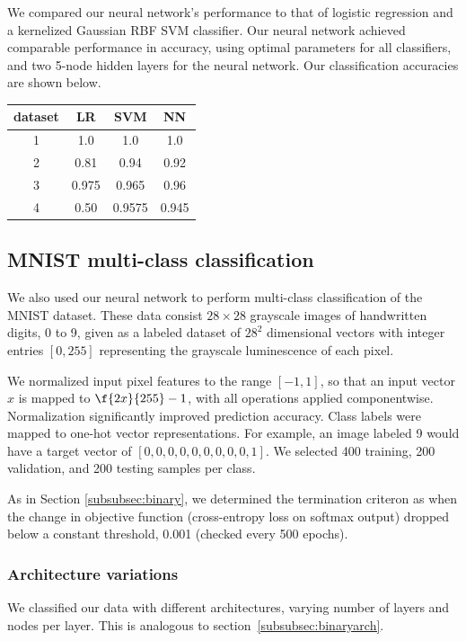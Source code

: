 \documentclass{article}
\begin{document}
\begin{multicols}{2}
We compared our neural network's performance to that of 
logistic regression and a kernelized Gaussian RBF SVM classifier.
Our neural network achieved comparable performance in accuracy,
using optimal parameters for all classifiers,
and two 5-node hidden layers for the neural network.
Our classification accuracies are shown below.

\begin{center}
    \begin{tabular}{c|c|c|c}
        dataset & LR & SVM & NN  \\\hline
        1	&1.0	& 1.0 & 1.0\\
        2	&0.81	& 0.94 & 0.92 \\
        3	&0.975 	& 0.965 & 0.96 \\
        4	&0.50	& 0.9575 & 0.945
    \end{tabular}
\end{center}

\subsection{MNIST multi-class classification}

We also used our neural network to perform multi-class classification of the
MNIST dataset. These data consist $28\times 28$ grayscale images of handwritten
digits, 0 to 9, given as a labeled dataset of $28^2$ dimensional vectors
with integer entries $[0,255]$ representing the grayscale luminescence of each pixel.

We normalized input pixel features to the range $[-1, 1]$,
so that an input vector $x$ is mapped to $\f{2x}{255}-1$,
with all operations applied componentwise.
Normalization significantly improved prediction accuracy.
Class labels were mapped to one-hot vector representations.
For example, an image labeled 9 would have a 
target vector of $[0,0,0,0,0,0,0,0,0,1]$.
We selected 400 training, 200 validation, and 200 testing samples per class.

As in Section \ref{subsubsec:binary}, we determined the termination criteron as
when the change in objective function (cross-entropy loss on softmax output)
dropped below a constant threshold, 0.001 (checked every 500 epochs).

\subsubsection{Architecture variations}

We classified our data with different architectures,
varying number of layers and nodes per layer.
This is analogous to section~\ref{subsubsec:binaryarch}.


\end{multicols}
\end{document}
